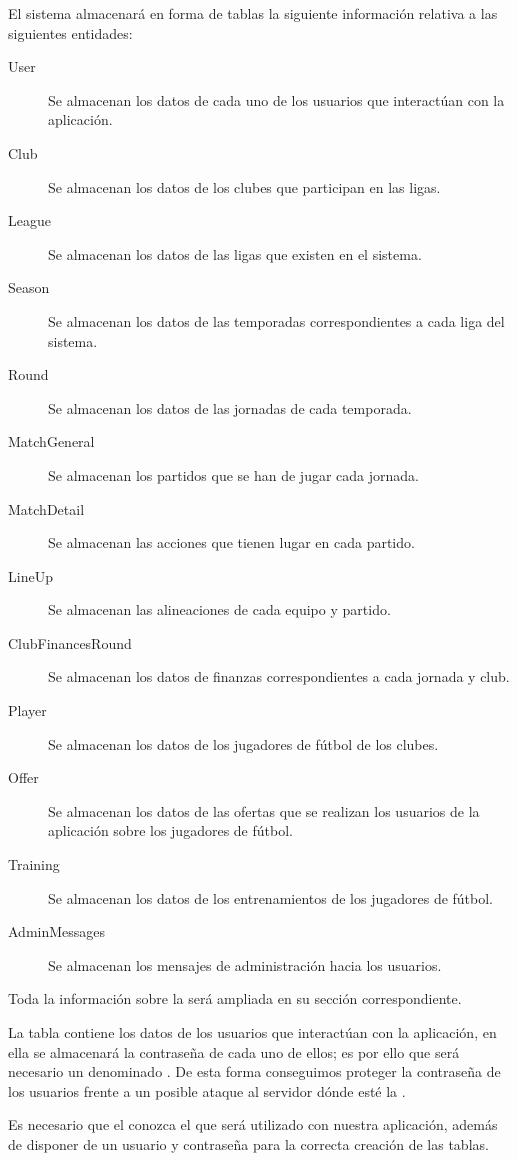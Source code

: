 El sistema almacenará en forma de tablas la siguiente información relativa a las
siguientes entidades:

\begin{description}
\item[User] Se almacenan los datos de cada uno de los usuarios que
  interactúan con la aplicación.
\item[Club] Se almacenan los datos de los clubes que participan en
  las ligas.
\item[League] Se almacenan los datos de las ligas que existen en el
  sistema.
\item[Season] Se almacenan los datos de las temporadas
  correspondientes a cada liga del sistema.
\item[Round] Se almacenan los datos de las jornadas de cada
  temporada.
\item[MatchGeneral] Se almacenan los partidos que se han de jugar
  cada jornada.
\item[MatchDetail] Se almacenan las acciones que tienen lugar en cada
  partido.
\item[LineUp] Se almacenan las alineaciones de cada equipo y partido.
\item[ClubFinancesRound] Se almacenan los datos de finanzas
  correspondientes a cada jornada y club.
\item[Player] Se almacenan los datos de los jugadores de fútbol de
  los clubes.
\item[Offer] Se almacenan los datos de las ofertas que se realizan
  los usuarios de la aplicación sobre los jugadores de fútbol.
\item[Training] Se almacenan los datos de los entrenamientos de los
  jugadores de fútbol.
\item[AdminMessages] Se almacenan los mensajes de administración
  hacia los usuarios.
\end{description}

Toda la información sobre la  será ampliada en su sección
correspondiente.

La tabla  contiene los datos de los usuarios que interactúan con
la aplicación, en ella se almacenará la contraseña de cada uno de ellos; es por
ello que será necesario un  denominado
. De esta forma conseguimos proteger la contraseña de los usuarios
frente a un posible ataque al servidor dónde esté la .

Es necesario que el  conozca el  que será
utilizado con nuestra aplicación, además de disponer de un usuario y contraseña
para la correcta creación de las tablas.


